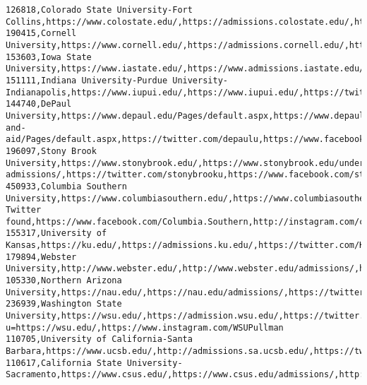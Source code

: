 \documentclass[11pt]{article}
\begin{document}
\begin{Verbatim}[commandchars=\\\{\}]
126818,Colorado State University-Fort Collins,https://www.colostate.edu/,https://admissions.colostate.edu/,https://twitter.com/coloradostateu,https://www.facebook.com/coloradostateuniversity,https://www.instagram.com/coloradostateuniversity/
190415,Cornell University,https://www.cornell.edu/,https://admissions.cornell.edu/,http://www.twitter.com/Cornell,https://www.facebook.com/Cornell,//instagram.com/CornellUniversity
153603,Iowa State University,https://www.iastate.edu/,https://www.admissions.iastate.edu/,http://twitter.com/IowaStateU,http://www.facebook.com/IowaStateU,https://www.instagram.com/iowastateu/
151111,Indiana University-Purdue University-Indianapolis,https://www.iupui.edu/,https://www.iupui.edu/,https://twitter.com/iupui,https://www.facebook.com/IUPUI/,https://www.instagram.com/p/BpZv1N\_AW32/
144740,DePaul University,https://www.depaul.edu/Pages/default.aspx,https://www.depaul.edu/admission-and-aid/Pages/default.aspx,https://twitter.com/depaulu,https://www.facebook.com/DePaulUniversity/,https://www.instagram.com/depaulu/
196097,Stony Brook University,https://www.stonybrook.edu/,https://www.stonybrook.edu/undergraduate-admissions/,https://twitter.com/stonybrooku,https://www.facebook.com/stonybrooku,http://instagram.com/stonybrooku
450933,Columbia Southern University,https://www.columbiasouthern.edu/,https://www.columbiasouthern.edu/admissions,No Twitter found,https://www.facebook.com/Columbia.Southern,http://instagram.com/columbiasouthernuniversity
155317,University of Kansas,https://ku.edu/,https://admissions.ku.edu/,https://twitter.com/KUnews,https://www.facebook.com/KU/,https://www.instagram.com/universityofkansas/
179894,Webster University,http://www.webster.edu/,http://www.webster.edu/admissions/,http://twitter.com/websteru,http://www.facebook.com/websteru,http://instagram.com/websteru
105330,Northern Arizona University,https://nau.edu/,https://nau.edu/admissions/,https://twitter.com/nau,https://www.facebook.com/NAUFlagstaff,https://instagram.com/nauflagstaff/
236939,Washington State University,https://wsu.edu/,https://admission.wsu.edu/,https://twitter.com/wsupullman,https://www.facebook.com/sharer/sharer.php?u=https://wsu.edu/,https://www.instagram.com/WSUPullman
110705,University of California-Santa Barbara,https://www.ucsb.edu/,http://admissions.sa.ucsb.edu/,https://twitter.com/ucsantabarbara,https://www.facebook.com/ucsantabarbara,https://www.instagram.com/ucsantabarbara/
110617,California State University-Sacramento,https://www.csus.edu/,https://www.csus.edu/admissions/,http://twitter.com/sacstate,http://www.facebook.com/sacstate,http://www.instagram.com/sacstate

\end{Verbatim}
\end{document}
